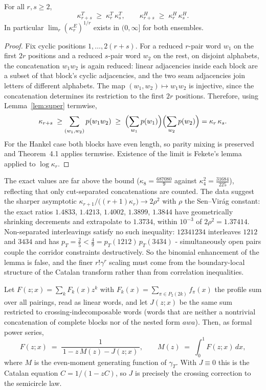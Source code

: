 \begin{lemma}\label{lem:kappa}
For all $r,s\ge2$,
\[
\kappa_{r+s}^{T}\;\ge\;\kappa_{r}^{T}\,\kappa_{s}^{T},
\qquad
\kappa_{r+s}^{H}\;\ge\;\kappa_{r}^{H}\,\kappa_{s}^{H}.
\]
In particular $\lim_r(\kappa_r^E)^{1/r}$ exists in $(0,\infty]$ for both
ensembles.
\end{lemma}

\begin{proof}
Fix cyclic positions $1,\dots,2(r+s)$.  For a reduced $r$-pair word $w_1$
on the first $2r$ positions and a reduced $s$-pair word $w_2$ on the rest,
on disjoint alphabets, the concatenation $w_1w_2$ is again reduced: linear
adjacencies inside each block are a subset of that block's cyclic
adjacencies, and the two seam adjacencies join letters of different
alphabets.  The map $(w_1,w_2)\mapsto w_1w_2$ is injective, since the
concatenation determines its restriction to the first $2r$ positions.
Therefore, using Lemma~\ref{lem:super} termwise,
\[
\kappa_{r+s}\;\ge\sum_{(w_1,w_2)}p(w_1w_2)\;\ge\;
\Bigl(\sum_{w_1}p(w_1)\Bigr)\Bigl(\sum_{w_2}p(w_2)\Bigr)
=\kappa_r\,\kappa_s .
\]
For the Hankel case both blocks have even length, so parity mixing is
preserved and Theorem~4.1 applies termwise.  Existence of the limit is
Fekete's lemma applied to $\log\kappa_r$.
\end{proof}

\begin{remark}\label{rmk:kappaasym}
The exact values are far above the bound
($\kappa_8=\tfrac{687080}{9}$ against $\kappa_4^2=\tfrac{31684}{225}$),
reflecting that only cut-separated concatenations are counted.  The data
suggest the sharper asymptotic
$\kappa_{r+1}/\bigl((r+1)\kappa_r\bigr)\to2\rho^2$ with $\rho$ the
Sen--Vir\'ag constant: the exact ratios $1.4833$, $1.4213$, $1.4002$,
$1.3899$, $1.3844$ have geometrically shrinking decrements and
extrapolate to $1.3734$, within $10^{-3}$ of $2\rho^2=1.37414$.  Non-separated interleavings satisfy no such inequality: $12341234$
interleaves $1212$ and $3434$ and has
$p_T=\tfrac25<\tfrac49=p_T(1212)\,p_T(3434)$ - simultaneously open pairs
couple the corridor constraints destructively.  So the binomial
enhancement of the lemma is false, and the finer $r!\gamma^r$ scaling
must come from the boundary-local structure of the Catalan transform
rather than from correlation inequalities.
\end{remark}

\begin{proposition}\label{prop:cluster}
Let $F(z;x)=\sum_k F_k(x)z^k$ with $F_k(x)=\sum_{\pi\in P_2(2k)}f_\pi(x)$
the profile sum over all pairings, read as linear words, and let
$J(z;x)$ be the same sum restricted to crossing-indecomposable words
(words that are neither a nontrivial concatenation of complete blocks
nor of the nested form $awa$).  Then, as formal power series,
\[
F(z;x)\;=\;\frac{1}{\,1-z\,M(z)-J(z;x)\,},
\qquad
M(z)\;=\;\int_0^1F(z;x)\,dx ,
\]
where $M$ is the even-moment generating function of $\gamma_T$.  With
$J\equiv0$ this is the Catalan equation $C=1/(1-zC)$, so $J$ is
precisely the crossing correction to the semicircle law.
\end{proposition}

